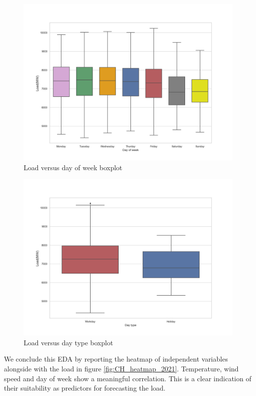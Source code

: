 \begin{figure}[!h]
    \includegraphics[width=\textwidth]{images/CH_day_of_week_boxplot_2021.png}
    \caption{Load versus day of week boxplot}
    \label{fig:CH_day_of_week_boxplot_2021}
\end{figure}

\begin{figure}[!h]
    \includegraphics[width=\textwidth]{images/CH_is_holiday_boxplot_2021.png}
    \caption{Load versus day type boxplot}
    \label{fig:CH_is_holiday_boxplot_2021}
\end{figure}

We conclude this EDA by reporting the heatmap of independent variables alongside with the load in figure \ref{fig:CH_heatmap_2021}. Temperature, wind speed and day of week show a meaningful correlation. This is a clear indication of their suitability as predictors for forecasting the load.

